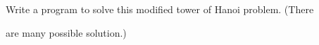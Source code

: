 Write a program to solve this modified tower of Hanoi problem. (There

are many possible solution.)


